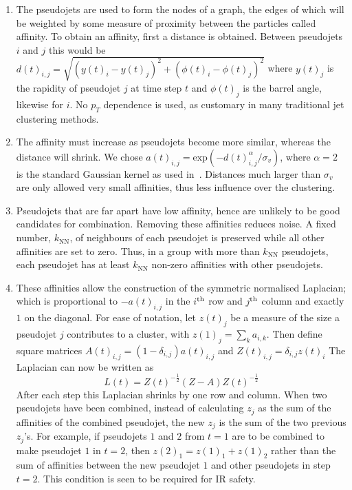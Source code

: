     \begin{enumerate}
        \item \label{step:start} The pseudojets are used to form the nodes of a graph,
        the edges of which will be weighted by some measure of proximity between the particles called affinity.
        To obtain an affinity, first a distance is obtained.
        Between pseudojets \(i\) and \(j\) this would be \(d(t)_{i,j} = \sqrt{(y(t)_i - y(t)_j)^2 + (\phi(t)_i - \phi(t)_j)^2}\)
        where \(y(t)_j\) is the rapidity of pseudojet \(j\) at time step \(t\) and \(\phi(t)_j\) is the barrel angle, likewise for \(i\).
        No \(p_T\) dependence is used, as customary in many traditional jet clustering methods.

    \item \label{step:affinity} The affinity must increase as pseudojets become more similar,
        whereas the distance will shrink.
        We chose \(a(t)_{i,j} = \text{exp}(-d(t)_{i,j}^\alpha/\sigma_v)\),
        where $\alpha=2$ is the standard Gaussian kernel as
        used in~\cite{BelkinNiyogi2003}.
            Distances much larger than \(\sigma_v\) are only allowed very small affinities,
            thus less influence over the clustering.

    \item\label{step:KNN} Pseudojets that are far apart have low affinity,
        hence are unlikely to be good candidates for combination.
        Removing these affinities reduces noise.
    A fixed number, \(k_\text{NN}\), of neighbours of each pseudojet is 
    preserved while all other affinities are set to zero.
    Thus, in a group with more than \(k_\text{NN}\) pseudojets,
    each pseudojet has at least \(k_\text{NN}\) non-zero affinities with other pseudojets.

\item\label{step:laplacean} These affinities allow the construction of the symmetric normalised
        Laplacian; which is proportional to \(-a(t)_{i, j}\)
        in the \(i\)$^{\rm th}$ row and \(j\)$^{\rm th}$ column and exactly \(1\) on the diagonal.
        For ease of notation, let \(z(t)_j\) be a measure of the size a pseudojet \(j\) contributes to a cluster,
        with \(z(1)_j = \sum_k a_{i,k}\).
        Then define square matrices \(A(t)_{i, j} = (1 - \delta_{i, j}) a(t)_{i, j}\) and \(Z(t)_{i, j} = \delta_{i, j} z(t)_i\)
        The Laplacian can now be written as
       \begin{equation}\label{eqn:Laplacian}
        L(t) = Z(t)^{-\frac{1}{2}}(Z - A)Z(t)^{-\frac{1}{2}}
       \end{equation}
        After each step this Laplacian shrinks by one row and column.
        When two pseudojets have been combined, instead of calculating \(z_j\) as the sum of the affinities of the combined pseudojet,
        the new \(z_j\) is the sum of the two previous \(z_j\)'s.
        For example, if pseudojets \(1\) and \(2\) from \(t=1\) are to be combined to make pseudojet \(1\) in \(t=2\),
        then \(z(2)_{1} = z(1)_1 + z(1)_2\) rather than the sum of affinities between the new pseudojet \(1\) and other pseudojets in step \(t=2\).
        This condition is seen to be required for IR safety. 


\end{enumerate}
